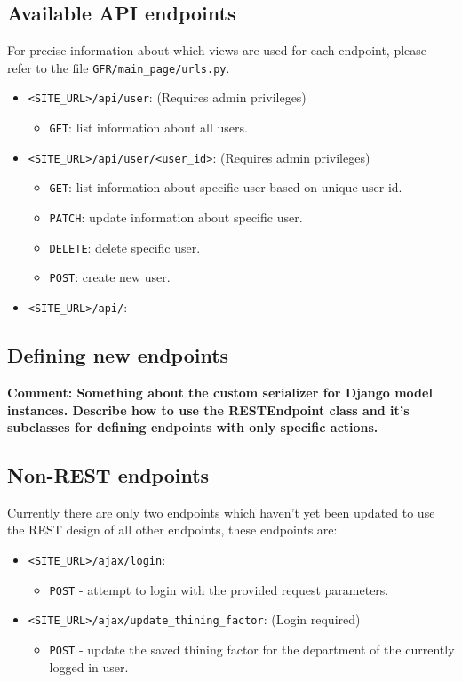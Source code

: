 \documentclass{article}
\newcommand{\makecomment}[1]{{\color{red} \bf Comment: #1}}
\begin{document}
\subsection{Available API endpoints}
For precise information about which views are used for each endpoint, please refer to the file \texttt{GFR/main\_page/urls.py}.

\begin{itemize}
	\item \texttt{<SITE\_URL>/api/user}: (Requires admin privileges)
	\begin{itemize}
		\item \texttt{GET}: list information about all users.
	\end{itemize}
	
	\item \texttt{<SITE\_URL>/api/user/<user\_id>}: (Requires admin privileges)
	\begin{itemize}
		\item \texttt{GET}: list information about specific user based on unique user id.
		\item \texttt{PATCH}: update information about specific user.
		\item \texttt{DELETE}: delete specific user.
		\item \texttt{POST}: create new user.
	\end{itemize}

	\item \texttt{<SITE\_URL>/api/}:
\end{itemize}

\subsection{Defining new endpoints}
\makecomment{Something about the custom serializer for Django model instances. Describe how to use the RESTEndpoint class and it's subclasses for defining endpoints with only specific actions.}

\subsection{Non-REST endpoints}
Currently there are only two endpoints which haven't yet been updated to use the REST design of all other endpoints, these endpoints are:
\begin{itemize}
	\item \texttt{<SITE\_URL>/ajax/login}:
	\begin{itemize}
		\item \texttt{POST} - attempt to login with the provided request parameters.
	\end{itemize}

	\item \texttt{<SITE\_URL>/ajax/update\_thining\_factor}: (Login required)
	\begin{itemize}
		\item \texttt{POST} - update the saved thining factor for the department of the currently logged in user.
	\end{itemize}
\end{itemize}
\end{document}
